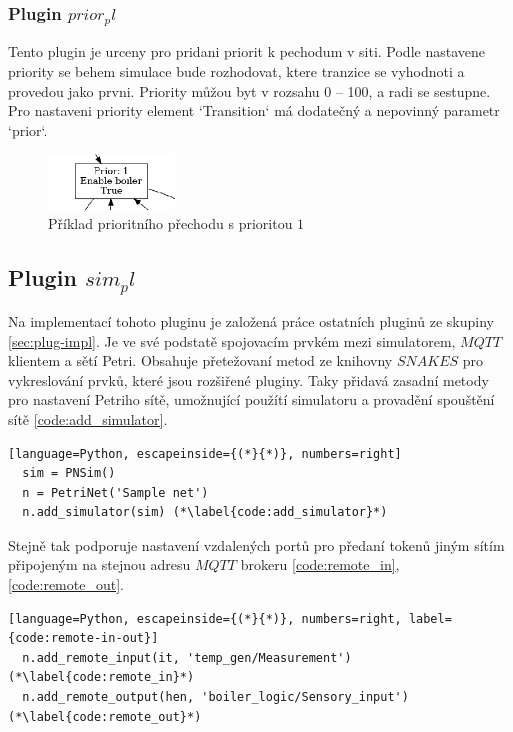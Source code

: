 \subsubsection{Plugin $prior_pl$}
\label{subsec:prior_pl}
Tento plugin je urceny pro pridani priorit k pechodum v siti. Podle nastavene priority se behem simulace bude rozhodovat, ktere tranzice se vyhodnoti a provedou jako prvni. Priority můžou byt v rozsahu 0 -- 100, a radi se sestupne. Pro nastaveni priority element `Transition` má dodatečný a nepovinný parametr `prior`. 
\begin{figure}[hbt]
  \centering
  \includegraphics[width=0.3\textwidth]{obrazky-figures/prior-transition.png}
  \caption{Příklad prioritního přechodu s prioritou $1$}
  \label{prior-transition}
\end{figure}

\subsection{Plugin $sim_pl$}
\label{sec:aplikace-mqtt}
Na implementací tohoto pluginu je založená práce ostatních pluginů ze skupiny \ref{sec:plug-impl}. Je ve své podstatě spojovacím prvkém mezi simulatorem, $MQTT$ klientem a sětí Petri. Obsahuje přetežovaní metod ze knihovny $SNAKES$ pro vykreslování prvků, které jsou rozšiřené pluginy. Taky přidavá zasadní metody pro nastavení Petriho sítě, umožnující použítí simulatoru a provadění spouštění sítě \ref{code:add_simulator}.
\begin{lstlisting}[language=Python, escapeinside={(*}{*)}, numbers=right]
  sim = PNSim()
  n = PetriNet('Sample net')
  n.add_simulator(sim) (*\label{code:add_simulator}*)
\end{lstlisting}

Stejně tak podporuje nastavení vzdalených portů pro předaní tokenů jiným sítím připojeným na stejnou adresu $MQTT$ brokeru \ref{code:remote_in}, \ref{code:remote_out}.

\begin{lstlisting}[language=Python, escapeinside={(*}{*)}, numbers=right, label={code:remote-in-out}]
  n.add_remote_input(it, 'temp_gen/Measurement') (*\label{code:remote_in}*)
  n.add_remote_output(hen, 'boiler_logic/Sensory_input') (*\label{code:remote_out}*)
\end{lstlisting}



